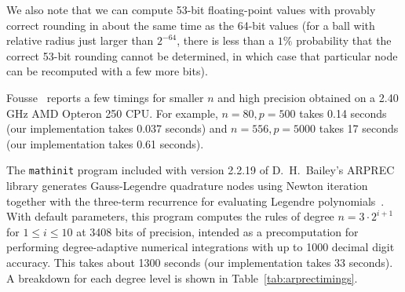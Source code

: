 \documentclass[11pt,a4paper]{article}
\begin{document}
We also note that we can compute 53-bit floating-point values
with provably correct rounding in about the same time as the 64-bit
values (for a ball with relative radius just larger than $2^{-64}$, there
is less than a $1\%$ probability that the correct 53-bit rounding
cannot be determined, in which case that particular node
can be recomputed with a few more bits).

Fousse~\cite{fousse2007accurate} reports a few timings for smaller $n$ and high precision
obtained on a 2.40 GHz AMD Opteron 250 CPU.
For example, $n = 80, p = 500$ takes 0.14 seconds (our implementation
takes 0.037 seconds) and $n = 556, p = 5000$ takes 17 seconds
(our implementation takes 0.61 seconds).

The \texttt{mathinit} program included with version 2.2.19
of D.\ H.\ Bailey's ARPREC library
generates Gauss-Legendre quadrature nodes
using Newton iteration together with the three-term recurrence for evaluating
Legendre polynomials~\cite{bailey2002arprec,bailey2011high}.
With default parameters, this program computes the rules of degree $n = 3 \cdot 2^{i+1}$
for $1 \le i \le 10$ at 3408 bits of precision, intended as
a precomputation for performing
degree-adaptive numerical integrations with up to 1000 decimal digit accuracy.
This takes about 1300 seconds (our implementation takes 33 seconds).
A breakdown for each degree level
is shown in Table~\ref{tab:arprectimings}.
\end{document}

